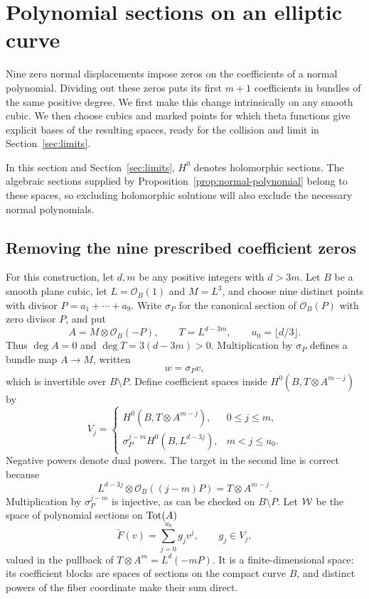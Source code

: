 \section{Polynomial sections on an elliptic curve}
\label{sec:elliptic}

Nine zero normal displacements impose zeros on the coefficients of a
normal polynomial. Dividing out these zeros puts its first $m+1$
coefficients in bundles of the same positive degree. We first make this
change intrinsically on any smooth cubic. We then choose cubics and
marked points for which theta functions give explicit bases of the
resulting spaces, ready for the collision and limit in
Section~\ref{sec:limits}.

In this section and Section~\ref{sec:limits}, $H^0$ denotes holomorphic
sections. The algebraic sections supplied by
Proposition~\ref{prop:normal-polynomial} belong to these spaces, so
excluding holomorphic solutions will also exclude the necessary normal
polynomials.

\subsection{Removing the nine prescribed coefficient zeros}

For this construction, let $d,m$ be any positive integers with $d>3m$.
Let $B$ be a smooth plane cubic, let $L=\mathcal O_B(1)$ and
$M=L^3$, and choose nine distinct points with divisor
$P=a_1+\cdots+a_9$. Write $\sigma_P$ for the canonical section of
$\mathcal O_B(P)$ with zero divisor $P$, and put
\[
 A=M\otimes\mathcal O_B(-P),\qquad
 T=L^{d-3m},\qquad u_0=\lfloor d/3\rfloor.
\]
Thus $\deg A=0$ and $\deg T=3(d-3m)>0$. Multiplication by
$\sigma_P$ defines a bundle map $A\to M$, written
\[
 w=\sigma_P v,
\]
which is invertible over $B\setminus P$. Define coefficient spaces
inside $H^0(B,T\otimes A^{m-j})$ by
\begin{equation}
 V_j=
 \begin{cases}
 H^0(B,T\otimes A^{m-j}),&0\leq j\leq m,\\[1mm]
 \sigma_P^{j-m}H^0(B,L^{d-3j}),&m<j\leq u_0.
 \end{cases}
\label{eq:coefficient-spaces}
\end{equation}
Negative powers denote dual powers. The target in the second line is
correct because
\[
 L^{d-3j}\otimes\mathcal O_B((j-m)P)=T\otimes A^{m-j}.
\]
Multiplication by $\sigma_P^{j-m}$ is injective, as can be checked on
$B\setminus P$. Let $\mathcal W$ be the space of polynomial sections on
$\operatorname{Tot}(A)$
\[
 \widetilde F(v)=\sum_{j=0}^{u_0}g_jv^j,\qquad g_j\in V_j,
\]
valued in the pullback of $T\otimes A^m=L^d(-mP)$.
It is a finite-dimensional space: its coefficient blocks are spaces of
sections on the compact curve $B$, and distinct powers of the fiber
coordinate make their sum direct.

